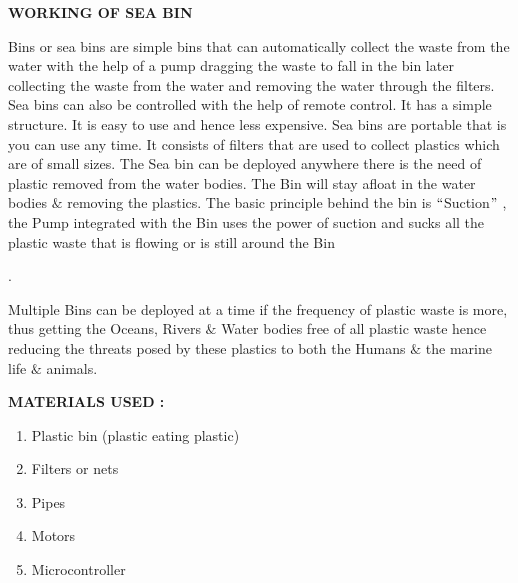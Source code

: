 \documentclass[12pt]{article}
\begin{document}
{\fontsize{24pt}{28.8pt}\selectfont \textbf{WORKING OF SEA BIN}\par}\par

Bins or sea bins are simple bins that can automatically collect the waste from the water with the help of a pump dragging the waste to fall in the bin later collecting the waste from the water and removing the water through the filters. Sea bins can also be controlled with the help of remote control. It has a simple structure. It is easy to use and hence less expensive. Sea bins are portable that is you can use any time. It consists of filters that are used to collect plastics which are of small sizes. The Sea bin can be deployed anywhere there is the need of plastic removed from the water bodies. The Bin will stay afloat in the water bodies $\&$  removing the plastics. The basic principle behind the bin is $``$Suction$"$ , the Pump integrated with the Bin uses the power of suction and sucks all the plastic waste that is flowing or is still around the Bin{\fontsize{16pt}{19.2pt}\selectfont . \par}Multiple Bins can be deployed at a time if the frequency of plastic waste is more, thus getting the Oceans, Rivers $\&$  Water bodies free of all plastic waste hence reducing the threats posed by these plastics to both the Humans $\&$  the marine life $\&$  animals. \par


\vspace{\baselineskip}
{\fontsize{24pt}{28.8pt}\selectfont \textbf{MATERIALS USED :}\par}\par

\begin{enumerate}
	\item Plastic bin (plastic eating plastic)\par

	\item Filters or nets\par

	\item Pipes\par

	\item Motors\par

	\item Microcontroller
\end{enumerate}\par
\end{document}
